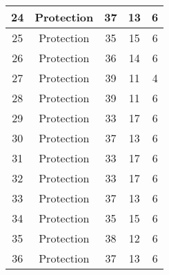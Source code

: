 \documentclass[results.tex]{subfiles}
\begin{document}
\begin{center}
\begin{tabular}{| c || c | c | c | c |}
            \hline
            24                      & Protection                   & 37                     & 13                      & 6                    \\
            \hline
            25                      & Protection                   & 35                     & 15                      & 6                    \\
            \hline
            26                      & Protection                   & 36                     & 14                      & 6                    \\
            \hline
            27                      & Protection                   & 39                     & 11                      & 4                    \\
            \hline
            28                      & Protection                   & 39                     & 11                      & 6                    \\
            \hline
            29                      & Protection                   & 33                     & 17                      & 6                    \\
            \hline
            30                      & Protection                   & 37                     & 13                      & 6                    \\
            \hline
            31                      & Protection                   & 33                     & 17                      & 6                    \\
            \hline
            32                      & Protection                   & 33                     & 17                      & 6                    \\
            \hline
            33                      & Protection                   & 37                     & 13                      & 6                    \\
            \hline
            34                      & Protection                   & 35                     & 15                      & 6                    \\
            \hline
            35                      & Protection                   & 38                     & 12                      & 6                    \\
            \hline
            36                      & Protection                   & 37                     & 13                      & 6                    \\

\end{tabular}
\end{center}
\end{document}
